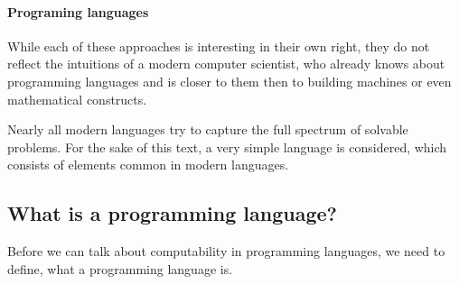 \paragraph{Programing languages}
While each of these approaches is interesting in their own right, they do not 
reflect the intuitions of a modern computer scientist, who already knows 
about programming languages and is closer to them then to building machines 
or even mathematical constructs.

Nearly all modern languages try to capture the full spectrum of solvable 
problems. For the sake of this text, a very simple language is considered, 
which consists of elements common in modern languages.

\subsection{What is a programming language?} %
\label{sub:What is a programming language}
Before we can talk about computability in programming languages, we need to 
define, what a programming language is. 


